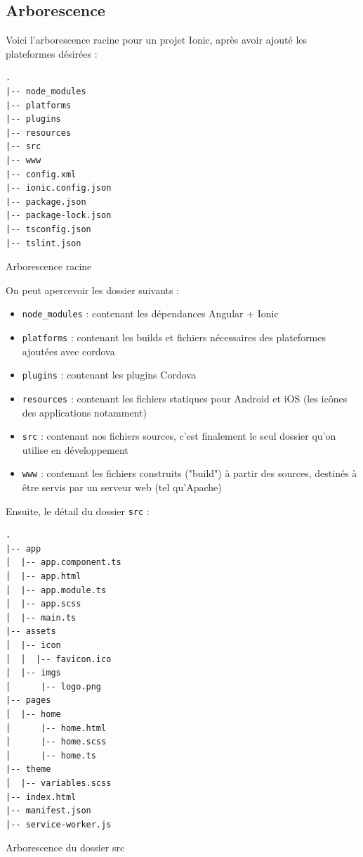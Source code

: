\documentclass[a4paper, 12pt]{article}
\newenvironment{code}{\captionsetup{type=listing}}{}
\begin{document}
\subsection{Arborescence}
Voici l'arborescence racine pour un projet Ionic, après avoir ajouté les plateformes désirées :
\begin{code}
    \begin{verbatim}
.
|-- node_modules
|-- platforms
|-- plugins
|-- resources
|-- src
|-- www
|-- config.xml
|-- ionic.config.json
|-- package.json
|-- package-lock.json
|-- tsconfig.json
|-- tslint.json
    \end{verbatim}
    \caption{Arborescence racine}
\end{code}
On peut apercevoir les dossier suivants : 
\begin{itemize}
    \item \texttt{node_modules} : contenant les dépendances Angular + Ionic
    \item \texttt{platforms} : contenant les builds et fichiers nécessaires des plateformes ajoutées avec cordova
    \item \texttt{plugins} : contenant les plugins Cordova
    \item \texttt{resources} : contenant les fichiers statiques pour Android et iOS (les icônes des applications notamment)
    \item \texttt{src} : contenant nos fichiers sources, c'est finalement le seul dossier qu'on utilise en développement
    \item \texttt{www} : contenant les fichiers construits ("build") à partir des sources, destinés à être servis par 
        un serveur web (tel qu'Apache)
\end{itemize}
Ensuite, le détail du dossier \texttt{src} : 
\\
\begin{code}
    \begin{verbatim}
.
|-- app
│  |-- app.component.ts
│  |-- app.html
│  |-- app.module.ts
│  |-- app.scss
│  |-- main.ts
|-- assets
│  |-- icon
│  │  |-- favicon.ico
│  |-- imgs
│      |-- logo.png
|-- pages
│  |-- home
│      |-- home.html
│      |-- home.scss
│      |-- home.ts
|-- theme
│  |-- variables.scss
|-- index.html
|-- manifest.json
|-- service-worker.js
    \end{verbatim}
    \caption{Arborescence du dossier src}
\end{code}
\end{document}
